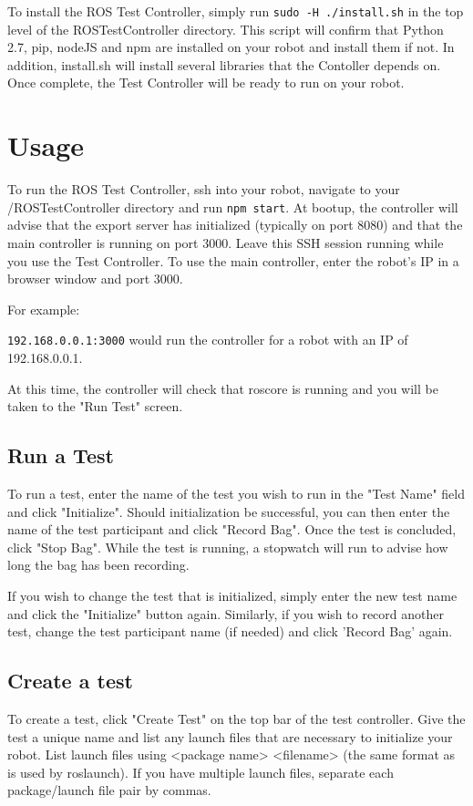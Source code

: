 \documentclass[onecolumn, draftclsnofoot,10pt, compsoc]{report}
\begin{document}
To install the ROS Test Controller, simply run \texttt{sudo -H ./install.sh} in the top level of the ROSTestController directory. This script will confirm that Python 2.7, pip, nodeJS and npm are installed on your robot and install them if not. In addition, install.sh will install several libraries that the Contoller depends on. Once complete, the Test Controller will be ready to run on your robot.
\section{Usage}

To run the ROS Test Controller, ssh into your robot, navigate to your /ROSTestController directory and run \texttt{npm start}. At bootup, the controller will advise that the export server has initialized (typically on port 8080) and that the main controller is running on port 3000. Leave this SSH session running while you use the Test Controller. To use the main controller, enter the robot's IP in a browser window and port 3000.

For example:

\texttt{192.168.0.0.1:3000} would run the controller for a robot with an IP of 192.168.0.0.1.

At this time, the controller will check that roscore is running and you will be taken to the "Run Test" screen.
\subsection{Run a Test}

To run a test, enter the name of the test you wish to run in the "Test Name" field and click "Initialize". Should initialization be successful, you can then enter the name of the test participant and click "Record Bag". Once the test is concluded, click "Stop Bag". While the test is running, a stopwatch will run to advise how long the bag has been recording.

If you wish to change the test that is initialized, simply enter the new test name and click the "Initialize" button again. Similarly, if you wish to record another test, change the test participant name (if needed) and click 'Record Bag' again.

\subsection{Create a test}
To create a test, click "Create Test" on the top bar of the test controller. Give the test a unique name and list any launch files that are necessary to initialize your robot. List launch files using <package name> <filename> (the same format as is used by roslaunch). If you have multiple launch files, separate each package/launch file pair by commas. 
\end{document}
